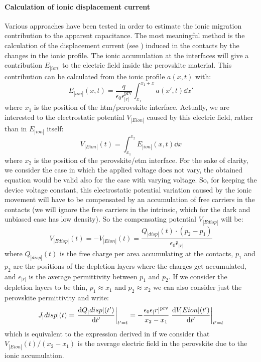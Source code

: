 	\paragraph{Calculation of ionic displacement current}\label{displacement_current_ionic}
	Various approaches have been tested in order to estimate the ionic migration contribution to the apparent capacitance.
	The most meaningful method is the calculation of the displacement current (see ) induced in the contacts by the changes in the ionic profile.
	The ionic accumulation at the interfaces will give a contribution $E_|ion|$ to the electric field inside the perovskite material.
	This contribution can be calculated from the ionic profile $a(x,t)$ with:
	\begin{equation}
		E_|ion|(x,t) = \frac{q}{\epsilon_0 \epsilon_|r|^{\mathrm{prv}}} \int_{x_1}^{x_1 + x} a(x',t) \dd x'
	\end{equation}
	where $x_1$ is the position of the \gls{htm}\-/perovskite interface.
	Actually, we are interested to the electrostatic potential $V_|Eion|$ caused by this electric field, rather than in $E_|ion|$ itself:
		\begin{equation}
		V_|Eion|(t) = \int_{x_1}^{x_2} E_|ion|(x,t) \dd x
		\end{equation}
		where $x_2$ is the position of the perovskite\-/\gls{etm} interface.
		For the sake of clarity, we consider the case in which the applied voltage does not vary, the obtained equation would be valid also for the case with varying voltage.
		So, for keeping the device voltage constant, this electrostatic potential variation caused by the ionic movement will have to be compensated by an accumulation of free carriers in the contacts (we will ignore the free carriers in the intrinsic, which for the dark and unbiased case has low density).
		So the compensating potential $V_|Edisp|$ will be:
				\begin{equation}
				V_|Edisp|(t) = -V_|Eion|(t) = \frac{Q_|disp|(t) \cdot (p_2-p_1)}{\epsilon_0 \bar\epsilon_|r|}
				\end{equation}
				where $Q_|disp|(t)$ is the free charge per area accumulating at the contacts, $p_1$ and $p_2$ are the positions of the depletion layers where the charges get accumulated, and $\bar\epsilon_|r|$ is the average permittivity between $p_1$ and $p_2$.
		If we consider the depletion layers to be thin, $p_1 \approx x_1$ and $p_2 \approx x_2$ we can also consider just the perovskite permittivity and write:
						\begin{equation}
		J_|disp|(t) = \eval{\dv{Q_|disp|(t')}{t'}}_{t'=t} = -\frac{\epsilon_0 \epsilon_|r|^{\mathrm{prv}}}{x_2-x_1} \eval{\dv{V_|Eion|(t')}{t'}}_{t'=t}
						\end{equation}
						which is equivalent to the expression derived in  if we consider that $V_|Eion|(t)/(x_2-x_1)$ is the average electric field in the perovskite due to the ionic accumulation.
	
